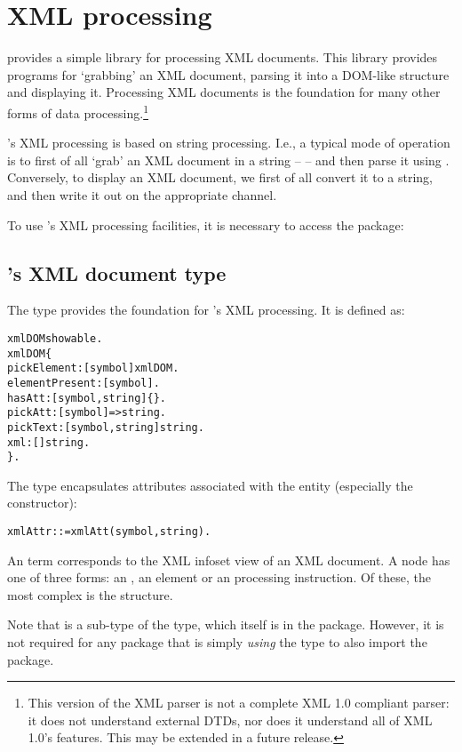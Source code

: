 \chapter{XML processing}
\label{xml}

\go provides a simple library for processing XML documents. This library provides programs for `grabbing' an XML document, parsing it into a DOM-like structure and displaying it. Processing XML documents is the foundation for many other forms of data processing.\footnote{This version of the XML parser is not a complete XML 1.0 compliant parser: it does not understand external DTDs, nor does it understand all of XML 1.0's features. This may be extended in a future release.}

\go's XML processing is based on string processing. I.e., a typical mode of operation is to first of all `grab' an XML document in a string --  -- and then parse it using . Conversely, to display an XML document, we first of all convert it to a string, and then write it out on the appropriate channel.

To use \go's XML processing facilities, it is necessary to access the  package:

\section{\go's XML document type}

The  type provides the foundation for \go's XML processing. It is defined as:
\begin{alltt}
xmlDOM \impl showable.
xmlDOM \impl \{ 
  pickElement:[symbol]\funarrow{}xmlDOM. 
  elementPresent:[symbol]{}.
  hasAtt:[symbol,string]\{\}.
  pickAtt:[symbol]=>string.
  pickText:[symbol,string]\funarrow{}string.
  xml:[]\funarrow{}string.
\}.
\end{alltt}
The  type encapsulates attributes associated with the  entity (especially the  constructor):
\begin{alltt}
  xmlAttr ::= xmlAtt(symbol,string).
\end{alltt}

An  term corresponds to the XML infoset view of an XML document. A node has one of three forms: an , an  element or an  processing instruction. Of these, the most complex is the  structure.

\begin{aside}
Note that  is a sub-type of the  type, which itself is in the  package. However, it is not required for any package that is simply \emph{using} the  type to also import the  package.
\end{aside}

